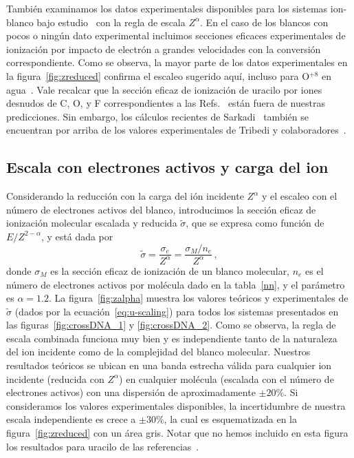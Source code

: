 También examinamos los datos experimentales disponibles para los sistemas
ion-blanco bajo estudio~\cite{itoh2013,iriki2011,wolff2014,wang2016,
Bhattacharjee2019,agnihotri2012,agnihotri2013,Luna2007,Bolorizadeh86,
H_Rudd85,toburen80,Ohsawa05,Bhattacharjee17,DalCappello2009,Tribedi_O_water} 
con la regla de escala $Z^\alpha$. 
En el caso de los blancos con pocos o ningún dato experimental incluimos 
secciones eficaces experimentales de ionización por impacto de electrón 
\cite{rahman2016,bug2017,wolf2019,fuss2009} a grandes velocidades con la
conversión correspondiente. Como se observa, la mayor parte de los datos
experimentales en la figura~\ref{fig:zreduced} confirma el escaleo 
sugerido aquí, incluso para O$^{+8}$ en agua~\cite{Tribedi_O_water}. 
Vale recalcar que la sección eficaz de ionización de uracilo por 
iones desnudos de C, O, y F correspondientes a las 
Refs.~\cite{agnihotri2012,agnihotri2013} están fuera de nuestras 
predicciones. Sin embargo, los cálculos recientes de 
Sarkadi~\cite{sarkadi2016} también se encuentran por arriba de los 
valores experimentales de Tribedi y 
colaboradores~\cite{agnihotri2012,agnihotri2013}.


\subsection{Escala con electrones activos y carga del ion}
\label{sec:nez_scaling}

Considerando la reducción con la carga del ión incidente $Z^\alpha$ y el 
escaleo con el número de electrones activos del blanco, introducimos 
la sección eficaz de ionización molecular escalada y reducida 
$\tilde{\sigma}$, que se expresa como función de $E/Z^{2-\alpha}$, y
está dada por
\begin{equation}
 \tilde{\sigma}=\frac{\sigma_e}{Z^{\alpha}}=\frac{\sigma_M/n_e}{Z^{\alpha}}\,,
\label{eq:u-scaling}
\end{equation}
donde $\sigma_M$ es la sección eficaz de ionización de un blanco 
molecular, $n_e$ es el número de electrones activos por molécula dado
en la tabla~\ref{nn}, y el parámetro es $\alpha=1.2$. La 
figura~\ref{fig:zalpha} muestra los valores teóricos y experimentales
de $\tilde{\sigma}$ (dados por la ecuación~\ref{eq:u-scaling}) para todos 
los sistemas presentados en las figuras~\ref{fig:crossDNA_1} y 
\ref{fig:crossDNA_2}. Como se observa, la regla de escala combinada 
funciona muy bien y es independiente tanto de la naturaleza del ion 
incidente como de la complejidad del blanco molecular. Nuestros 
resultados teóricos se ubican en una banda estrecha válida para cualquier
ion incidente (reducida con $Z^\alpha$) en cualquier molécula
(escalada con el número de electrones activos) con una dispersión de 
aproximadamente $\pm 20\%$. Si consideramos los valores experimentales
disponibles, la incertidumbre de nuestra escala independiente es 
crece a $\pm 30\%$, la cual es esquematizada en la 
figura~\ref{fig:zreduced} con un área gris. Notar que no hemos incluido 
en esta figura los resultados para uracilo de las 
referencias~\cite{agnihotri2012,agnihotri2013}. 


